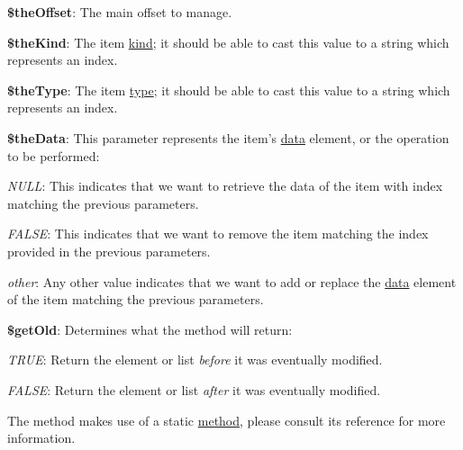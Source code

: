 \begin{DoxyItemize}
\item {\bfseries \$the\-Offset}\-: The main offset to manage. 
\item {\bfseries \$the\-Kind}\-: The item \hyperlink{}{kind}; it should be able to cast this value to a string which represents an index. 
\item {\bfseries \$the\-Type}\-: The item \hyperlink{}{type}; it should be able to cast this value to a string which represents an index. 
\item {\bfseries \$the\-Data}\-: This parameter represents the item's \hyperlink{}{data} element, or the operation to be performed\-: 
\begin{DoxyItemize}
\item {\itshape N\-U\-L\-L}\-: This indicates that we want to retrieve the data of the item with index matching the previous parameters. 
\item {\itshape F\-A\-L\-S\-E}\-: This indicates that we want to remove the item matching the index provided in the previous parameters. 
\item {\itshape other}\-: Any other value indicates that we want to add or replace the \hyperlink{}{data} element of the item matching the previous parameters. 
\end{DoxyItemize}
\item {\bfseries \$get\-Old}\-: Determines what the method will return\-: 
\begin{DoxyItemize}
\item {\itshape T\-R\-U\-E}\-: Return the element or list {\itshape before} it was eventually modified. 
\item {\itshape F\-A\-L\-S\-E}\-: Return the element or list {\itshape after} it was eventually modified. 
\end{DoxyItemize}
\end{DoxyItemize}

The method makes use of a static \hyperlink{class_c_attribute_a200333aed4419e123658883a9e4495e2}{method}, please consult its reference for more information.


